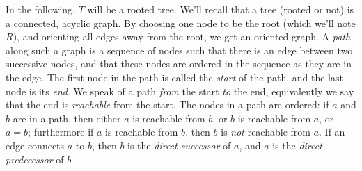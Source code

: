 In the following, $T$ will be a rooted tree. We'll recall that a tree (rooted or not) is a connected, acyclic graph. By choosing one node to be the root (which we'll note $R$), and orienting all edges away from the root, we get an oriented graph. A \textit{path} along such a graph is a sequence of nodes such that there is an edge between two successive nodes, and that these nodes are ordered in the sequence as they are in the edge. The first node in the path is called the \textit{start} of the path, and the last node is its \textit{end}. We speak of a path \textit{from} the start \textit{to} the end, equivalently we say that the end is \textit{reachable} from the start. The nodes in a path are ordered: if $a$ and $b$ are in a path, then either $a$ is reachable from $b$, or $b$ is reachable from $a$, or $a = b$; furthermore if $a$ is reachable from $b$, then $b$ is \textit{not} reachable from $a$. If an edge connects $a$ to $b$, then $b$ is the \textit{direct successor} of $a$, and $a$ is the \textit{direct predecessor} of $b$
